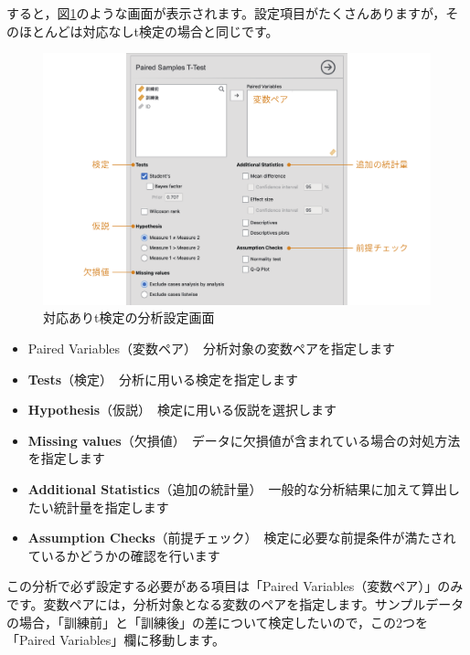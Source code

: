 \documentclass[
  12pt,
  a5jpaper,
  lualatex, ja=standard]{bxjsbook}
\providecommand{\tightlist}{%
  \setlength{\itemsep}{0pt}\setlength{\parskip}{0pt}}
\newenvironment{jmvsettings}{%
	\begin{center}%
	\begin{tcolorbox}[%
		title=設定項目,
		colframe=gmoji,
		colbacktitle=gmoji,
		colback=gmoji!2!white,
		breakable,
		width=.9\textwidth,
		]\small\addtolength{\leftmargini}{-3\labelsep}%
	}%
	{\end{tcolorbox}\end{center}}
\begin{document}
すると，図\ref{fig:ttests-paired-setting}のような画面が表示されます。設定項目がたくさんありますが，そのほとんどは対応なしt検定の場合と同じです。

\begin{figure}[!ht]

{\centering \includegraphics[width=1\linewidth]{images/ttests/paired-setting} 

}

\caption{対応ありt検定の分析設定画面}\label{fig:ttests-paired-setting}
\end{figure}

\begin{jmvsettings}

\begin{itemize}
\tightlist
\item
  Paired Variables（変数ペア）　分析対象の変数ペアを指定します
\item
  \textbf{Tests}（検定）　分析に用いる検定を指定します
\item
  \textbf{Hypothesis}（仮説）　検定に用いる仮説を選択します
\item
  \textbf{Missing values}（欠損値）　データに欠損値が含まれている場合の対処方法を指定します
\item
  \textbf{Additional Statistics}（追加の統計量）　一般的な分析結果に加えて算出したい統計量を指定します
\item
  \textbf{Assumption Checks}（前提チェック）　検定に必要な前提条件が満たされているかどうかの確認を行います
\end{itemize}

\end{jmvsettings}

この分析で必ず設定する必要がある項目は「Paired Variables（変数ペア）」のみです。変数ペアには，分析対象となる変数のペアを指定します。サンプルデータの場合，「訓練前」と「訓練後」の差について検定したいので，この2つを「Paired Variables」欄に移動します。
\end{document}
